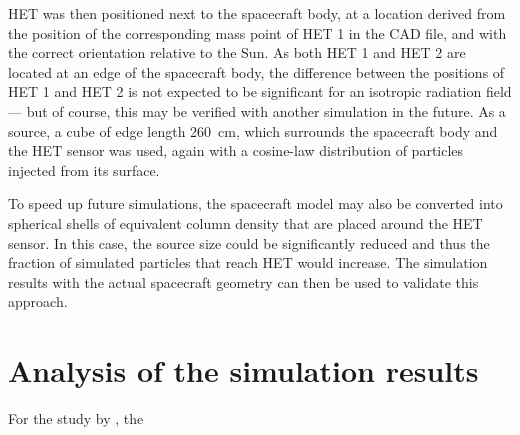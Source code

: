 HET was then positioned next to the spacecraft body, at a location derived from the position of the corresponding mass point of HET 1 in the CAD file, and with the correct orientation relative to the Sun. As both HET 1 and HET 2 are located at an edge of the spacecraft body, the difference between the positions of HET 1 and HET 2 is not expected to be significant for an isotropic radiation field --- but of course, this may be verified with another simulation in the future. As a source, a cube of edge length \SI{260}{\centi\meter}, which surrounds the spacecraft body and the HET sensor was used, again with a cosine-law distribution of particles injected from its surface.

To speed up future simulations, the spacecraft model may also be converted into spherical shells of equivalent column density that are placed around the HET sensor. In this case, the source size could be significantly reduced and thus the fraction of simulated particles that reach HET would increase. The simulation results with the actual spacecraft geometry can then be used to validate this approach.

\section{Analysis of the simulation results}

For the study by \citet{Forstner-2021-SolO}, the 